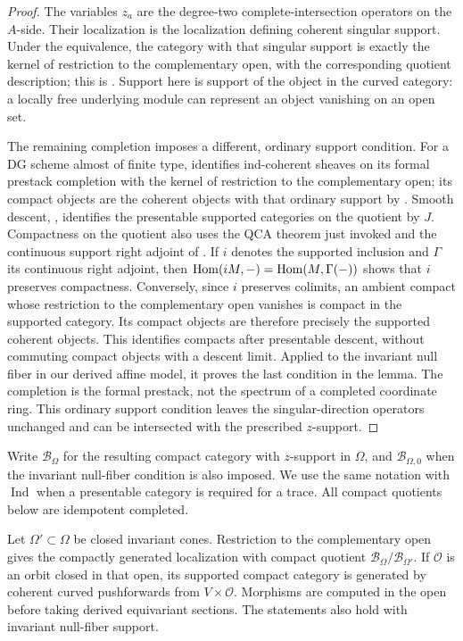 \begin{proof}
The variables $z_a$ are the degree-two complete-intersection operators
on the $A$-side.  Their localization is the localization defining
coherent singular support.  Under the equivalence, the category with
that singular support is exactly the kernel of restriction to the
complementary open, with the corresponding quotient description;
this is \cite[Proposition~2.3.9]{Toda}.  Support here is support of the
object in the curved category: a locally free underlying module can
represent an object vanishing on an open set.

The remaining completion imposes a different, ordinary support
condition.  For a DG scheme almost of finite type,
\cite[Proposition~7.4.5]{DGIndschemes} identifies ind-coherent sheaves
on its formal prestack completion with the kernel of restriction to
the complementary open; its compact objects are the coherent objects
with that ordinary support by \cite[Proposition~4.1.7(b)]{IndCoh}.
Smooth descent, \cite[Corollary~10.4.5]{IndCoh}, identifies the
presentable supported categories on the quotient by $J$. Compactness
on the quotient also uses the QCA theorem just invoked and the continuous
support right adjoint of \cite[Corollary~4.1.5]{IndCoh}. If $i$ denotes
the supported inclusion and $\Gamma$ its continuous right adjoint, then
$\operatorname{Hom}(iM,-)=\operatorname{Hom}(M,\Gamma(-))$ shows that $i$ preserves compactness.
Conversely, since $i$ preserves colimits, an ambient compact whose
restriction to the complementary open vanishes is compact in the
supported category. Its compact objects are therefore precisely the
supported coherent objects. This identifies compacts after presentable
descent, without commuting compact objects with a descent limit.
Applied to the invariant null fiber in our derived affine model, it
proves the last condition in the lemma.
The completion is the formal prestack, not the spectrum of a completed
coordinate ring.  This ordinary support condition leaves the
singular-direction operators unchanged and can be intersected with
the prescribed $z$-support.
\end{proof}

Write $\mathscr B_\Omega$ for the resulting compact category with
$z$-support in $\Omega$, and $\mathscr B_{\Omega,0}$ when the invariant
null-fiber condition is also imposed.  We use the same notation with
$\operatorname{Ind}$ when a presentable category is required for a trace.  All
compact quotients below are idempotent completed.

\begin{lemma}\label{orb:localization}
Let $\Omega'\subset\Omega$ be closed invariant cones.  Restriction to
the complementary open gives the compactly generated localization
with compact quotient $\mathscr B_\Omega/\mathscr B_{\Omega'}$.
If $\mathcal O$ is an orbit closed in that open, its supported compact
category is generated by coherent curved pushforwards from
$V\times\mathcal O$.  Morphisms are computed in the open before taking
derived equivariant sections.  The statements also hold with invariant
null-fiber support.
\end{lemma}

